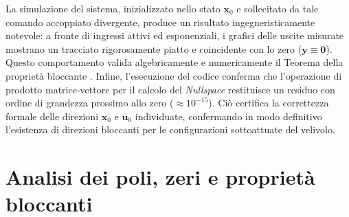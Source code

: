 La simulazione del sistema, inizializzato nello stato $\mathbf{x}_0$ e sollecitato da tale comando accoppiato divergente, produce un risultato ingegneristicamente notevole: a fronte di ingressi attivi ed esponenziali, i grafici delle uscite misurate mostrano un tracciato rigorosamente piatto e coincidente con lo zero ($\mathbf{y} \equiv \mathbf{0}$). Questo comportamento valida algebricamente e numericamente il Teorema della proprietà bloccante \cite{ferramosca_cal_multivariabili_misc}. Infine, l'esecuzione del codice conferma che l'operazione di prodotto matrice-vettore per il calcolo del \textit{Nullspace} restituisce un residuo con ordine di grandezza prossimo allo zero ($\approx 10^{-15}$). Ciò certifica la correttezza formale delle direzioni $\mathbf{x}_0$ e $\mathbf{u}_0$ individuate, confermando in modo definitivo l'esistenza di direzioni bloccanti per le configurazioni sottoattuate del velivolo.
\section{Analisi dei poli, zeri e proprietà bloccanti}

